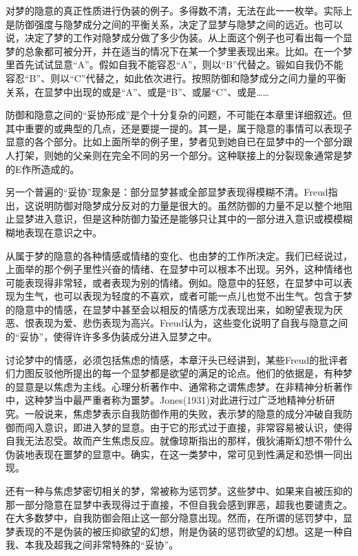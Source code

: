 \documentclass[UTF8,10pt,a4paper,openany]{book}
\begin{document}
对梦的隐意的真正性质进行伪装的例子。多得数不清，无法在此一一枚举。实际上是防御强度与隐梦成分之间的平衡关系，决定了显梦与隐梦之间的远近。也可以说，决定了梦的工作对隐梦成分做了多少伪装。从上面这个例子也可看出每一个显梦的总象都可被分开，并在适当的情况下在某一个梦里表现出来。比如。在一个梦里首先试试显意“A”。假如自我不能容忍“A”，则以“B”代替之。锻如自我仍不能容忍“B”、则以“C”代替之，如此依次进行。按照防御和隐梦成分之间力量的平衡关系，在显梦中出现的或是“A”、或是“B”、或屡“C”、或是\ldots\ldots

防御和隐意之间的“妥协形成”是个十分复杂的问题，不可能在本章里详细叙述。但其中重要的或典型的几点，还是要提一提的。其一是，属于隐意的事情可以表现子显意的各个部分。比如上面所举的例子里，梦者见到她自已在显梦中的一个部分跟人打架，则她的父亲则在完全不同的另一个部分。这种联接上的分裂现象通常是梦的E作所造成的。

另一个普遍的“妥协”现象是：部分显梦甚或全部显梦表现得模糊不清。Freud指出，这说明防御对隐梦成分反对的力量是很大的。虽然防御的力量不足以整个地阻止显梦进入意识，但是这种防御力蛩还是能够只让其中的一部分进入意识或模模糊糊地表现在意识之中。

从属于梦的隐意的各种情感或情绪的变化、也由梦的工作所决定。我们已经说过，上面举的那个例子里性兴奋的情绪、在显梦中可以根本不出现。另外，这种情绪也可能表现得非常轻，或者表现为别的情绪。例如。隐意中的狂怒，在显梦中可以表现为生气，也可以表现为轻度的不喜欢，或者可能一点儿也觉不出生气。包含于梦的隐意中的情感，在显梦中甚至会以相反的情感方戊表现出来，如盼望表现为厌恶、恨表现为爱、悲伤表现为高兴。Freud认为，这些变化说明了自我与隐意之间的“妥协”，使得许许多多伪装成分进入显梦之中。

讨论梦中的情感，必须包括焦虑的情感，本章汗头已经讲到，某些Freud的批评者们力图反驳他所提出的每一个显梦都是欲望的满足的论点。他们的依据是，有种梦的显意是以焦虑为主线。心理分析著作中、通常称之谓焦虑梦。在非精神分析著作中，这种梦当中最严重者称为噩梦。Jones(1931)对此进行过广泛地精神分析研究。一般说来，焦虑梦表示自我防御作用的失败，表示梦的隐意的成分冲破自我防御而闯入意识，即进入梦的显意。由于它的形式过于直接，非常容易被认识，使得自我无法忍受。故而产生焦虑反应。就像琼斯指出的那样，俄狄浦斯幻想不带什么伪装地表现在噩梦的显意中。确实，在这一类梦中，常可见到性满足和恐惧一同出现。

还有一种与焦虑梦密切相关的梦，常被称为惩罚梦。这些梦中、如果来自被压抑的那一部分隐意在显梦中表现得过于直接，不但自我会感到罪恶，超我也要谴责之。在大多数梦中，自我防御会阻止这一部分隐意出现。然而，在所谓的惩罚梦中，显梦表现的不是伪装的被压抑欲望的幻想，附是伪装的惩罚欲望的幻想。这是一种自我、本我及超我之间非常特殊的“妥协”。
\end{document}
